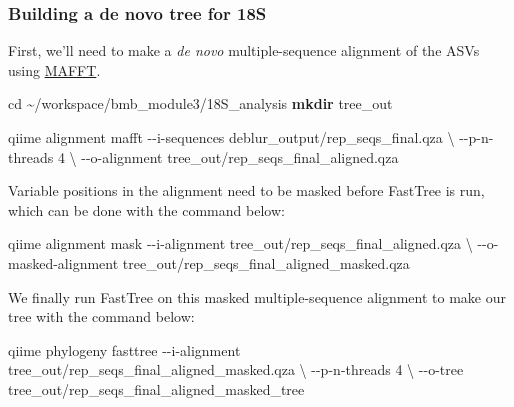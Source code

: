 \documentclass[
]{book}
\newenvironment{Shaded}{\begin{snugshade}}{\end{snugshade}}
\newcommand{\AttributeTok}[1]{\textcolor[rgb]{0.13,0.29,0.53}{#1}}
\newcommand{\BuiltInTok}[1]{#1}
\newcommand{\DataTypeTok}[1]{\textcolor[rgb]{0.13,0.29,0.53}{#1}}
\newcommand{\ExtensionTok}[1]{#1}
\newcommand{\FunctionTok}[1]{\textcolor[rgb]{0.13,0.29,0.53}{\textbf{#1}}}
\newcommand{\NormalTok}[1]{#1}
\begin{document}
\subsubsection{Building a de novo tree for 18S}\label{building-a-de-novo-tree-for-18s}

First, we'll need to make a \emph{de novo} multiple-sequence alignment of the ASVs using \href{https://mafft.cbrc.jp/alignment/software/}{MAFFT}.

\begin{Shaded}
\begin{Highlighting}[]
\BuiltInTok{cd}\NormalTok{ \textasciitilde{}/workspace/bmb\_module3/18S\_analysis}
\FunctionTok{mkdir}\NormalTok{ tree\_out}

\ExtensionTok{qiime}\NormalTok{ alignment mafft }\AttributeTok{{-}{-}i{-}sequences}\NormalTok{ deblur\_output/rep\_seqs\_final.qza }\DataTypeTok{\textbackslash{}}
                      \AttributeTok{{-}{-}p{-}n{-}threads}\NormalTok{ 4 }\DataTypeTok{\textbackslash{}}
                      \AttributeTok{{-}{-}o{-}alignment}\NormalTok{ tree\_out/rep\_seqs\_final\_aligned.qza}
\end{Highlighting}
\end{Shaded}

Variable positions in the alignment need to be masked before FastTree is run, which can be done with the command below:

\begin{Shaded}
\begin{Highlighting}[]
\ExtensionTok{qiime}\NormalTok{ alignment mask }\AttributeTok{{-}{-}i{-}alignment}\NormalTok{  tree\_out/rep\_seqs\_final\_aligned.qza }\DataTypeTok{\textbackslash{}}
                     \AttributeTok{{-}{-}o{-}masked{-}alignment}\NormalTok{  tree\_out/rep\_seqs\_final\_aligned\_masked.qza}
\end{Highlighting}
\end{Shaded}

We finally run FastTree on this masked multiple-sequence alignment to make our tree with the command below:

\begin{Shaded}
\begin{Highlighting}[]
\ExtensionTok{qiime}\NormalTok{ phylogeny fasttree }\AttributeTok{{-}{-}i{-}alignment}\NormalTok{ tree\_out/rep\_seqs\_final\_aligned\_masked.qza }\DataTypeTok{\textbackslash{}}
                         \AttributeTok{{-}{-}p{-}n{-}threads}\NormalTok{ 4 }\DataTypeTok{\textbackslash{}}
                         \AttributeTok{{-}{-}o{-}tree}\NormalTok{ tree\_out/rep\_seqs\_final\_aligned\_masked\_tree}
\end{Highlighting}
\end{Shaded}
\end{document}
